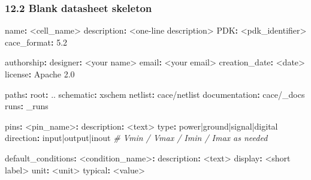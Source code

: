 \documentclass[
]{article}
\newenvironment{Shaded}{}{}
\newcommand{\AttributeTok}[1]{\textcolor[rgb]{0.49,0.56,0.16}{#1}}
\newcommand{\CommentTok}[1]{\textcolor[rgb]{0.38,0.63,0.69}{\textit{#1}}}
\newcommand{\FloatTok}[1]{\textcolor[rgb]{0.25,0.63,0.44}{#1}}
\newcommand{\FunctionTok}[1]{\textcolor[rgb]{0.02,0.16,0.49}{#1}}
\newcommand{\KeywordTok}[1]{\textcolor[rgb]{0.00,0.44,0.13}{\textbf{#1}}}
\begin{document}
\hypertarget{blank-datasheet-skeleton}{%
\subsubsection{12.2 Blank datasheet
skeleton}\label{blank-datasheet-skeleton}}

\begin{Shaded}
\begin{Highlighting}[]
\FunctionTok{name}\KeywordTok{:}\AttributeTok{           \textless{}cell\_name\textgreater{}}
\FunctionTok{description}\KeywordTok{:}\AttributeTok{    \textless{}one{-}line description\textgreater{}}
\FunctionTok{PDK}\KeywordTok{:}\AttributeTok{            \textless{}pdk\_identifier\textgreater{}}
\FunctionTok{cace\_format}\KeywordTok{:}\AttributeTok{    }\FloatTok{5.2}

\FunctionTok{authorship}\KeywordTok{:}
\AttributeTok{  }\FunctionTok{designer}\KeywordTok{:}\AttributeTok{         \textless{}your name\textgreater{}}
\AttributeTok{  }\FunctionTok{email}\KeywordTok{:}\AttributeTok{            \textless{}your email\textgreater{}}
\AttributeTok{  }\FunctionTok{creation\_date}\KeywordTok{:}\AttributeTok{    \textless{}date\textgreater{}}
\AttributeTok{  }\FunctionTok{license}\KeywordTok{:}\AttributeTok{          Apache 2.0}

\FunctionTok{paths}\KeywordTok{:}
\AttributeTok{  }\FunctionTok{root}\KeywordTok{:}\AttributeTok{             ..}
\AttributeTok{  }\FunctionTok{schematic}\KeywordTok{:}\AttributeTok{        xschem}
\AttributeTok{  }\FunctionTok{netlist}\KeywordTok{:}\AttributeTok{          cace/netlist}
\AttributeTok{  }\FunctionTok{documentation}\KeywordTok{:}\AttributeTok{    cace/\_docs}
\AttributeTok{  }\FunctionTok{runs}\KeywordTok{:}\AttributeTok{             \_runs}

\FunctionTok{pins}\KeywordTok{:}
\AttributeTok{  }\FunctionTok{\textless{}pin\_name\textgreater{}}\KeywordTok{:}
\AttributeTok{    }\FunctionTok{description}\KeywordTok{:}\AttributeTok{ \textless{}text\textgreater{}}
\AttributeTok{    }\FunctionTok{type}\KeywordTok{:}\AttributeTok{ power|ground|signal|digital}
\AttributeTok{    }\FunctionTok{direction}\KeywordTok{:}\AttributeTok{ input|output|inout}
\CommentTok{    \# Vmin / Vmax / Imin / Imax as needed}

\FunctionTok{default\_conditions}\KeywordTok{:}
\AttributeTok{  }\FunctionTok{\textless{}condition\_name\textgreater{}}\KeywordTok{:}
\AttributeTok{    }\FunctionTok{description}\KeywordTok{:}\AttributeTok{ \textless{}text\textgreater{}}
\AttributeTok{    }\FunctionTok{display}\KeywordTok{:}\AttributeTok{ \textless{}short label\textgreater{}}
\AttributeTok{    }\FunctionTok{unit}\KeywordTok{:}\AttributeTok{ \textless{}unit\textgreater{}}
\AttributeTok{    }\FunctionTok{typical}\KeywordTok{:}\AttributeTok{ \textless{}value\textgreater{}}


\end{Highlighting}
\end{Shaded}
\end{document}
